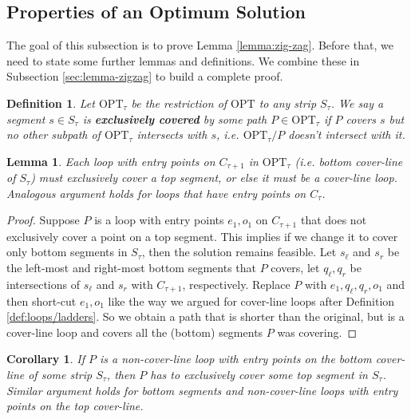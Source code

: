 \documentclass[10pt,a4paper]{amsart}
\theoremstyle{thmstyleone}
\newtheorem{lemma}{Lemma}
\newtheorem{corollary}{Corollary}
\newtheorem{definition}{Definition} %
\newcommand{\OPT}{{\text{OPT}}}
\begin{document}
\subsection{Properties of an Optimum Solution}\label{sec:zig-zag-lem}
The goal of this subsection is to prove Lemma \ref{lemma:zig-zag}. Before that,
we need to state some further lemmas and definitions. We combine these in Subsection \ref{sec:lemma-zigzag} to build a complete proof.

\begin{definition}\label{def:exclusively-cover}
    Let $\OPT_\tau$ be the restriction of $\OPT$ to any strip $S_\tau$.
    We say a segment $s \in S_\tau$ is \textbf{exclusively covered} by some path $P\in \OPT_\tau$ if $P$ covers $s$ but no other subpath of $\OPT_\tau$ intersects with $s$, i.e. $\OPT_\tau/P$ doesn't intersect with it.
\end{definition}

\begin{lemma}\label{lem:cover-line-loop}
    Each loop with entry points on $C_{\tau+1}$ in $\OPT_\tau$ (i.e. bottom cover-line of $S_\tau$) must exclusively cover a top segment, or else it must be a cover-line loop. Analogous argument holds for loops that have entry points on $C_\tau$.
\end{lemma}
\begin{proof}
    Suppose $P$ is a loop with entry points $e_1,o_1$ on $C_{\tau+1}$ that does not exclusively cover a point on a top segment. This implies if we change it to cover only bottom segments in $S_\tau$, then the solution remains feasible. Let $s_\ell$ and $s_r$ be the left-most and right-most bottom segments that $P$ covers, let $q_\ell,q_r$ be intersections of $s_\ell$ and $s_r$ with $C_{\tau+1}$, respectively. Replace $P$ with $e_1,q_\ell,q_r,o_1$ and then short-cut $e_1,o_1$ like the way we argued for cover-line loops after Definition \ref{def:loops/ladders}.
    So we obtain a path that is shorter than the original, but is a cover-line loop and covers all the (bottom) segments $P$ was covering.
\end{proof}
\begin{corollary}\label{cor:non-cover-line-loop-top-segment}
    If $P$ is a non-cover-line loop with entry points on the bottom cover-line of some strip $S_\tau$, then $P$ has to exclusively cover some top segment in $S_\tau$. Similar argument holds for bottom segments and non-cover-line loops with entry points on the top cover-line.
\end{corollary}
\end{document}
